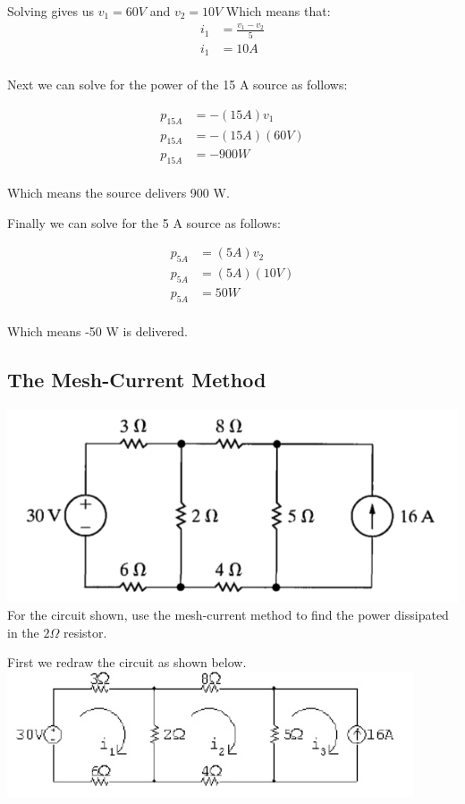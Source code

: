 Solving gives us $v_1 = 60 V$ and $v_2 = 10 V$
Which means that:
\begin{align*}
	i_1 &= \frac{v_1 - v_2}{5} \\
	i_1 &= 10A \\
\end{align*}

Next we can solve for the power of the 15 A source as follows:

\begin{align*}
	p_{15A} &= -(15A)v_1 \\
	p_{15A} &= -(15A)(60V) \\ 
	p_{15A} &= -900 W \\
\end{align*}

Which means the source delivers 900 W. 

Finally we can solve for the 5 A source as follows:

\begin{align*}
	p_{5A} &= (5A)v_2 \\
	p_{5A} &= (5A)(10V) \\
	p_{5A} &= 50 W \\
\end{align*}

Which means -50 W is delivered. 

\subsection{The Mesh-Current Method}
\includegraphics[scale=0.5]{img/c4/p2} \\

For the circuit shown, use the mesh-current method to find the power dissipated in the $2 \Omega$ 
resistor. 

First we redraw the circuit as shown below. \\
\includegraphics[scale=0.5]{img/c4/a2} \\

